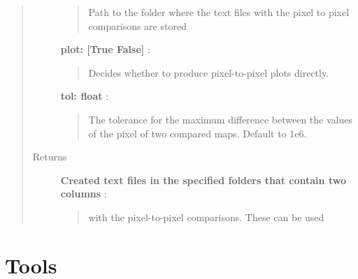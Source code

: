 \documentclass[a4paper,10pt,english]{sphinxmanual}
\begin{document}
\begin{fulllineitems}
\begin{fulllineitems}
\begin{quote}
\begin{description}
\begin{quote}
Path to the folder where the text files with the pixel
to pixel comparisons are stored
\end{quote}

\textbf{plot: {[}True \textbar{} False{]}} :
\begin{quote}

Decides whether to produce pixel-to-pixel plots directly.
\end{quote}

\textbf{tol: float} :
\begin{quote}

The tolerance for the maximum difference between the
values of the pixel of two compared maps. Default to 1e6.
\end{quote}

\item[{Returns }] \leavevmode
\textbf{Created text files in the specified folders that contain two columns} :
\begin{quote}

with the pixel-to-pixel comparisons. These can be used
\end{quote}

\end{description}\end{quote}

\end{fulllineitems}


\end{fulllineitems}



\section{Tools}
\label{maps:module-astrolyze.maps.tools}\label{maps:tools}
\end{document}
